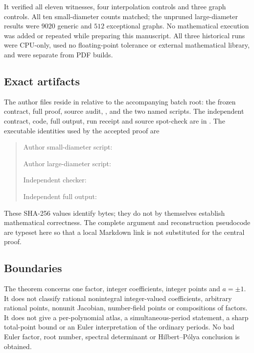 It verified all eleven witnesses, four interpolation controls and
three graph controls. All ten small-diameter counts matched; the
unpruned large-diameter results were $9020$ generic and $512$
exceptional graphs. No mathematical execution was added or repeated
while preparing this manuscript. All three historical runs were
CPU-only, used no floating-point tolerance or external mathematical
library, and were separate from PDF builds.

\subsection{Exact artifacts}
The author files reside in 
relative to the accompanying batch root: the frozen contract, full
proof, source audit, , and the two named scripts.
The independent contract, code, full output, run receipt and source
spot-check are in .
The executable identities used by the accepted proof are
\begin{quote}\footnotesize
Author small-diameter script:\par
{}\par
Author large-diameter script:\par
{}\par
Independent checker:\par
{}\par
Independent full output:\par
{}
\end{quote}
These SHA-256 values identify bytes; they do not by themselves
establish mathematical correctness. The complete argument and
reconstruction pseudocode are typeset here so that a local Markdown
link is not substituted for the central proof.

\subsection{Boundaries}
The theorem concerns one factor, integer coefficients, integer
points and $a=\pm1$. It does not classify rational nonintegral
integer-valued coefficients, arbitrary rational points, nonunit
Jacobian, number-field points or compositions of factors. It does
not give a per-polynomial atlas, a simultaneous-period statement,
a sharp total-point bound or an Euler interpretation of the
ordinary periods. No bad Euler factor, root number, spectral
determinant or Hilbert--P\'olya conclusion is obtained.

